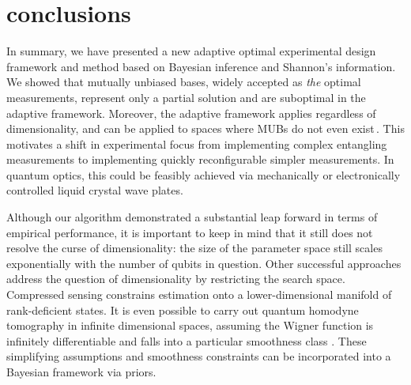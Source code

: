 \section{conclusions}

In summary, we have presented a new adaptive optimal experimental design framework and method based on Bayesian inference and Shannon's information. We showed that mutually unbiased bases, widely accepted as \emph{the} optimal measurements, represent only a partial solution and are suboptimal in the adaptive framework. Moreover, the adaptive framework applies regardless of dimensionality, and can be applied to spaces where MUBs do not even exist\,\cite{DimensionSix,ExactInformation}. This motivates a shift in experimental focus from implementing complex entangling measurements to implementing quickly reconfigurable simpler measurements. In quantum optics, this could be feasibly achieved via mechanically or electronically controlled liquid crystal wave plates.

Although our algorithm demonstrated a substantial leap forward in terms of empirical performance, it is important to keep in mind that it still does not resolve the curse of dimensionality: the size of the parameter space still scales exponentially with the number of qubits in question. Other successful approaches address the question of dimensionality by restricting the search space. Compressed sensing \cite{CompressedSensing} constrains estimation onto a lower-dimensional manifold of rank-deficient states. It is even possible to carry out quantum homodyne tomography in infinite dimensional spaces, assuming the Wigner function is infinitely differentiable and falls into a particular smoothness class \cite{Butucea2007}. These simplifying assumptions and smoothness constraints can be incorporated into a Bayesian framework via priors.


